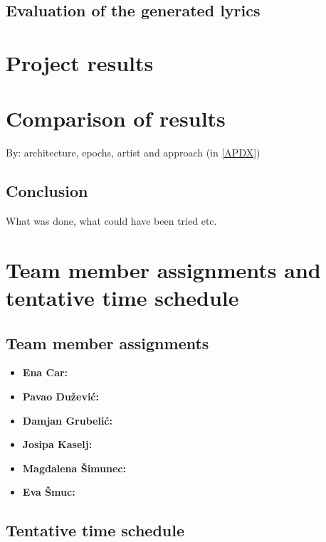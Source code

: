 \documentclass[conference]{IEEEtran}
\begin{document}
\subsection{Evaluation of the generated lyrics}




\section{Project results}
\section{Comparison of results}
By: architecture, epochs, artist and approach (in \ref{APDX})
\subsection{Conclusion}
What was done, what could have been tried etc.

 

\section{Team member assignments and tentative time schedule}
\subsection{Team member assignments}
\begin{itemize}
    \item \textbf{Ena Car:}
    \item \textbf{Pavao Dužević:}
    \item \textbf{Damjan Grubelić:}
    \item \textbf{Josipa Kaselj:}
    \item \textbf{Magdalena Šimunec:}
    \item \textbf{Eva Šmuc:}
\end{itemize}
\subsection{Tentative time schedule}
\end{document}
